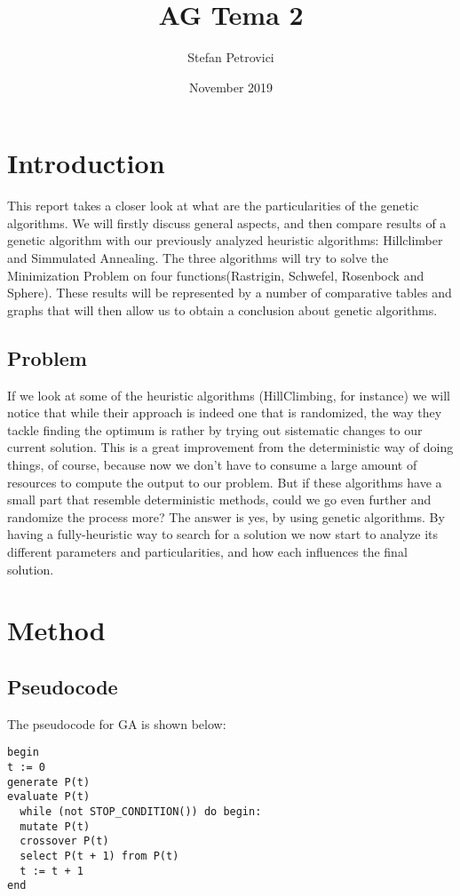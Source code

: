 \documentclass{article}
\title{AG Tema 2}
\author{Stefan Petrovici}
\date{November 2019}
\newcommand{\code}[1]{\colorbox{codegray}{\texttt{#1}}}
\begin{document}
\maketitle

\section{Introduction}
This report takes a closer look at what are the particularities of the genetic algorithms. We will firstly discuss general aspects, and then compare results of a genetic algorithm with our previously analyzed heuristic algorithms: Hillclimber and Simmulated Annealing. The three algorithms will try to solve the Minimization Problem on four functions(Rastrigin, Schwefel, Rosenbock and Sphere). These results will be represented by a number of comparative tables and graphs that will then allow us to obtain a conclusion about genetic algorithms.

\subsection{Problem}
If we look at some of the heuristic algorithms (HillClimbing, for instance) we will notice that while their approach is indeed one that is randomized, the way they tackle finding the optimum is rather by trying out sistematic changes to our current solution. This is a great improvement from the deterministic way of doing things, of course, because now we don't have to consume a large amount of resources to compute the output to our problem. But if these algorithms have a small part that resemble deterministic methods, could we go even further and randomize the process more? The answer is yes, by using genetic algorithms. By having a fully-heuristic way to search for a solution we now start to analyze its different parameters and particularities, and how each influences the final solution.

\section{Method}
\subsection{Pseudocode}

The pseudocode for GA is shown below:

\begin{tabbing}
\code{begin}\\
\code{t := 0}\\
\code{generate P(t)}\\
\code{evaluate P(t)}\\
\code{\ \ while (not STOP\_CONDITION()) do begin: }\\
\code{\ \ mutate P(t)}\\
\code{\ \ crossover P(t)}\\
\code{\ \ select P(t + 1) from P(t)}\\
\code{\ \ t := t + 1}\\
\code{end}\\
\end{tabbing}
\end{document}
